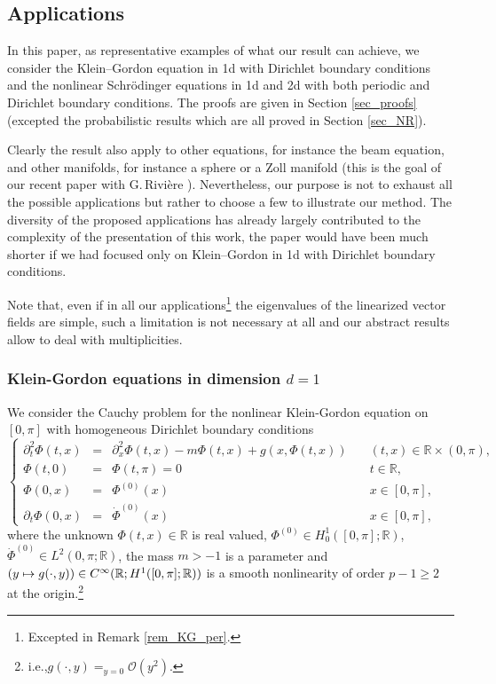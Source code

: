 \documentclass[11pt]{article}
\newcommand{\ie}{i.e.,\xspace}
\newcommand\mto{\mathchoice{\longmapsto}{\mapsto}{\mapsto}{\mapsto}}
\theoremstyle{definition}
\begin{document}
\subsection{Applications}
In this paper, as representative examples of what our result can achieve, we consider the Klein--Gordon equation in 1d with Dirichlet boundary conditions and the nonlinear Schrödinger equations in 1d and 2d with both periodic and Dirichlet boundary conditions. The proofs are given in Section \ref{sec_proofs} (excepted the probabilistic results which are all proved in Section \ref{sec_NR}).

Clearly the result also apply to other equations, for instance the beam equation, and other manifolds, for instance a sphere or a Zoll manifold (this is the goal of our recent paper with G.\,Rivière \cite{BGR}). Nevertheless, our purpose is not to exhaust all the possible applications but rather to choose a few to illustrate our method. The diversity of the proposed applications has already largely contributed to the complexity of the presentation of this work, the paper would have been much shorter if we had focused only on Klein--Gordon in 1d with Dirichlet boundary conditions.

Note that, even if in all our applications\footnote{Excepted in Remark \ref{rem_KG_per}.} the eigenvalues of the linearized vector fields are simple, such a limitation is not necessary at all and our abstract results allow to deal with multiplicities.

\subsubsection{Klein-Gordon equations in dimension $d=1$}
\label{sub_sec_KG}
We consider the Cauchy problem for the nonlinear Klein-Gordon equation on $[0,\pi]$ with homogeneous Dirichlet boundary conditions
\begin{equation}
\label{eq_KG}
\tag{KG}
\left\{ \begin{array}{rclll} \partial_t^2 \Phi(t,x) &=& \partial_x^2 \Phi(t,x) - m \Phi(t,x) + g(x,\Phi(t,x)) & \quad(t,x)\in \mathbb{R}\times (0,\pi), \\
\Phi(t,0) &=& \Phi(t,\pi) = 0 & \quad t\in \mathbb{R}, \\
\Phi(0,x) &=& \Phi^{(0)}(x) & \quad x\in [0,\pi], \\
\partial_t \Phi(0,x) &=& \dot{\Phi}^{(0)}(x) & \quad x\in [0,\pi],
\end{array}
\right.
\end{equation}
where the unknown $\Phi(t,x)\in \mathbb{R}$ is real valued, $\Phi^{(0)} \in H^1_0([0,\pi];\mathbb{R})$, $\dot{\Phi}^{(0)} \in L^2(0,\pi;\mathbb{R})$, the mass $m>-1$ is a parameter and $(y \mto g(\cdot,y)) \in C^\infty(\mathbb{R}; H^{1}([0,\pi];\mathbb{R}))$ is a smooth nonlinearity of order $p-1\geq 2$ at the origin.\footnote{ \ie $\displaystyle g(\cdot,y) \mathop{=}_{y=0} \mathcal{O}(y^2)$.}
\end{document}
